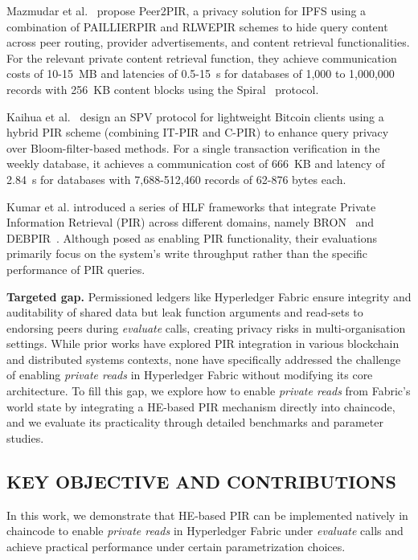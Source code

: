 \documentclass{ieeetj}
\begin{document}
Mazmudar et al.~\cite{mazmudar_peer2pir_2025} propose Peer2PIR, a privacy solution for IPFS using a combination of PAILLIERPIR and RLWEPIR schemes 
to hide query content across peer routing, provider advertisements, and content retrieval functionalities.
For the relevant private content retrieval function, they achieve communication costs of 10-15~MB and latencies of 0.5-15~s for 
databases of 1,000 to 1,000,000 records with 256~KB content blocks using the Spiral~\cite{spiral_2022} protocol.

Kaihua et al.~\cite{Kaihua2019applying} design an SPV protocol for lightweight Bitcoin clients using a hybrid PIR scheme (combining IT-PIR and C-PIR)
to enhance query privacy over Bloom-filter-based methods. For a single transaction verification in the weekly database, it achieves a 
communication cost of 666~KB and latency of 2.84~s for databases with 7,688-512,460 records of 62-876 bytes each.

Kumar et al. introduced a series of HLF frameworks that integrate Private Information Retrieval (PIR) across different domains, 
namely BRON~\cite{kumar_bron_2024} and DEBPIR~\cite{kumar_debpir_2025}. Although posed as enabling PIR functionality,
their evaluations primarily focus on the system's write throughput rather than the specific performance of PIR queries.

\textbf{Targeted gap.}
Permissioned ledgers like Hyperledger Fabric ensure integrity and auditability of shared data but leak function arguments and read-sets
to endorsing peers during \emph{evaluate} calls, creating privacy risks in multi-organisation settings.
While prior works have explored PIR integration in various blockchain and distributed systems contexts,
none have specifically addressed the challenge of enabling \emph{private reads} in Hyperledger Fabric without modifying its core architecture.
To fill this gap, we explore how to enable \emph{private reads} from Fabric’s world state by integrating a HE-based PIR mechanism directly into chaincode, 
and we evaluate its practicality through detailed benchmarks and parameter studies.

\subsection{KEY OBJECTIVE AND CONTRIBUTIONS}
In this work, we demonstrate that HE-based PIR can be implemented natively in chaincode to enable \emph{private reads} in 
Hyperledger Fabric under \emph{evaluate} calls and achieve practical performance under certain parametrization choices.
\end{document}
